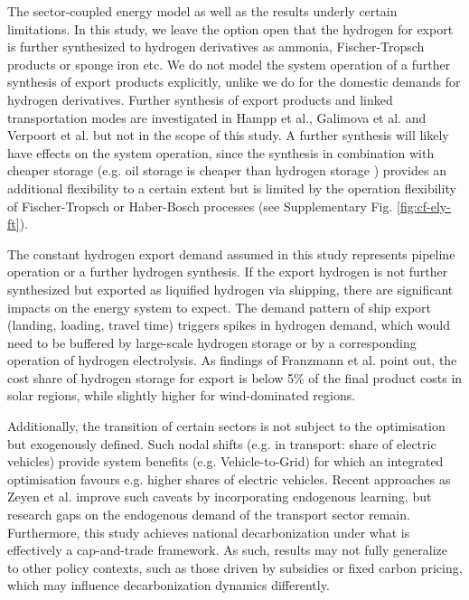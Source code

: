 \documentclass[5p,numafflabel]{elsarticle}
\begin{document}

The sector-coupled energy model as well as the results underly certain limitations. In this study, we leave the option open that the hydrogen for export is further synthesized to hydrogen derivatives as ammonia, Fischer-Tropsch products or sponge iron etc. We do not model the system operation of a further synthesis of export products explicitly, unlike we do for the domestic demands for hydrogen derivatives. Further synthesis of export products and linked transportation modes are investigated in Hampp et al.\cite{Hampp2023}, Galimova et al.\cite{Galimova2023} and Verpoort et al.\cite{Verpoort2023} but not in the scope of this study.
A further synthesis will likely have effects on the system operation, since the synthesis in combination with cheaper storage (e.g. oil storage is cheaper than hydrogen storage \cite{DEA2019TechnologyData}) provides an additional flexibility to a certain extent but is limited by the operation flexibility of Fischer-Tropsch or Haber-Bosch processes (see Supplementary Fig. \ref{fig:cf-ely-ft}).

The constant hydrogen export demand assumed in this study represents pipeline operation or a further hydrogen synthesis.
If the export hydrogen is not further synthesized but exported as liquified hydrogen via shipping, there are significant impacts on the energy system to expect. The demand pattern of ship export (landing, loading, travel time) triggers spikes in hydrogen demand, which would need to be buffered by large-scale hydrogen storage or by a corresponding operation of hydrogen electrolysis. As findings of Franzmann et al. \cite{Franzmann2023} point out, the cost share of hydrogen storage for export is below 5\% of the final product costs in solar regions, while slightly higher for wind-dominated regions.

Additionally, the transition of certain sectors is not subject to the optimisation but exogenously defined. Such nodal shifts (e.g. in transport: share of electric vehicles) provide system benefits (e.g. Vehicle-to-Grid) for which an integrated optimisation favours e.g. higher shares of electric vehicles.
Recent approaches as Zeyen et al.\cite{Zeyen2023} improve such caveats by incorporating endogenous learning, but research gaps on the endogenous demand of the transport sector remain.
Furthermore, this study achieves national decarbonization under what is effectively a cap-and-trade framework. As such, results may not fully generalize to other policy contexts, such as those driven by subsidies or fixed carbon pricing, which may influence decarbonization dynamics differently.
\end{document}
